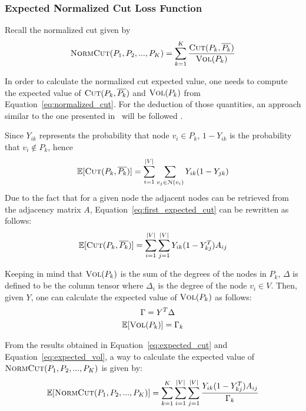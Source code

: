 \subsubsection{Expected Normalized Cut Loss Function}
Recall the normalized cut given by
\begin{equation}
    \label{eq:normalized_cut}
        \textsc{NormCut}(P_1, P_2, ..., P_K) = \sum_{k=1}^K \frac{\textsc{Cut}(P_k, \overline{P_k})}{\textsc{Vol}(P_k)}
\end{equation}
    
In order to calculate the normalized cut expected value, one needs to compute the expected value of $\textsc{Cut}(P_k, \overline{P_k})$ and $\textsc{Vol}(P_k)$ from Equation~\ref{eq:normalized_cut}. For the deduction of those quantities, an approach similar to the one presented in~\citep{gap2} will be followed .

Since $Y_{ik}$ represents the probability that node $v_i\in P_k$, $1 - Y_{ik}$ is the probability that $v_i\notin P_k$, hence 
\begin{equation}
    \label{eq:first_expected_cut}
    \mathbb{E}[\textsc{Cut}(P_k, \overline{P_k})] = \sum_{i=1}^{|V|} \sum_{v_j\in\EuScript{N}(v_i)} Y_{ik}(1-Y_{jk})
\end{equation}
Due to the fact that for a given node the adjacent nodes can be retrieved from the adjacency matrix $A$, Equation~\ref{eq:first_expected_cut} can be rewritten as follows:
\begin{equation}
    \label{eq:expected_cut}
    \mathbb{E}[\textsc{Cut}(P_k, \overline{P_k})] = \sum_{i=1}^{|V|}\sum_{j=1}^{|V|}Y_{ik}(1-Y_{kj}^T)A_{ij} 
\end{equation}

Keeping in mind that $\textsc{Vol}(P_k)$ is the sum of the degrees of the nodes in $P_k$, $\Delta$ is defined to be the column tensor where $\Delta_i$ is the degree of the node $v_i\in V$. Then, given $Y$, one can calculate the expected value of $\textsc{Vol}(P_k)$ as follows:
\begin{equation}
    \label{eq:expected_vol}
    \begin{split}
        \Gamma &= Y^T\Delta \\
        \mathbb{E}[\textsc{Vol}&(P_k)] = \Gamma_k
    \end{split}
\end{equation}

From the results obtained in Equation~\ref{eq:expected_cut} and Equation~\ref{eq:expected_vol}, a way to calculate the expected value of $\textsc{NormCut}(P_1, P_2, ..., P_K)$ is given by:
\begin{equation}
    \label{eq:expected_norm_cut}
    \mathbb{E}[\textsc{NormCut}(P_1, P_2, ..., P_K)] = \sum_{k=1}^K\sum_{i=1}^{|V|}\sum_{j=1}^{|V|}\frac{Y_{ik}(1-Y_{kj}^T)A_{ij}}{\Gamma_k}
\end{equation}

